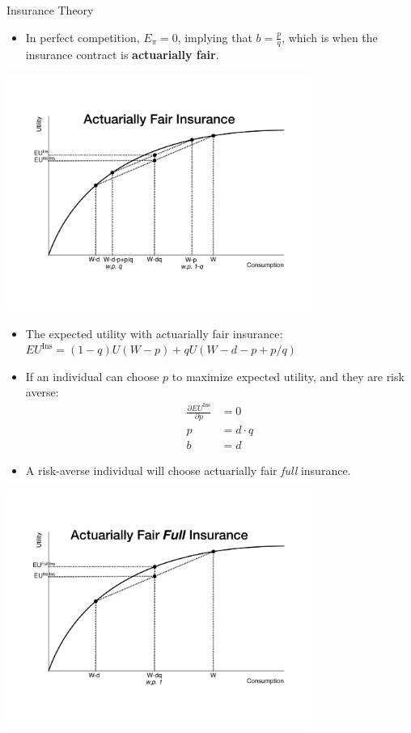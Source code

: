 \documentclass[8pt]{extarticle}
\begin{document}
\begin{problem}{Insurance Theory}
\begin{itemize}
      \item In perfect competition, $E_{\pi} = 0$, implying that $b = \frac{p}{q}$, which is when the insurance contract is \textbf{actuarially fair}.
    \end{itemize}
    \begin{center}
      \includegraphics[width=10cm]{images/insurance_expected_utility.pdf}
    \end{center}
    \begin{itemize}
      \item The expected utility with actuarially fair insurance: $EU^{\text{Ins}} = (1-q)U(W-p) + qU(W-d-p+p/q)$
      \item If an individual can choose $p$ to maximize expected utility, and they are risk averse:
        \begin{align*}
          \frac{\partial EU^{\text{Ins}}}{\partial p} &= 0\\
          p &= d\cdot q \tag*{Premium = Expected Damage}\\
          b &= d \tag*{Benefit = Damage}
        \end{align*}
      \item A risk-averse individual will choose actuarially fair \textit{full} insurance.
    \end{itemize}
    \begin{center}
      \includegraphics[width=10cm]{images/full_insurance_expected_utility.pdf}

\end{center}
\end{problem}
\end{document}
